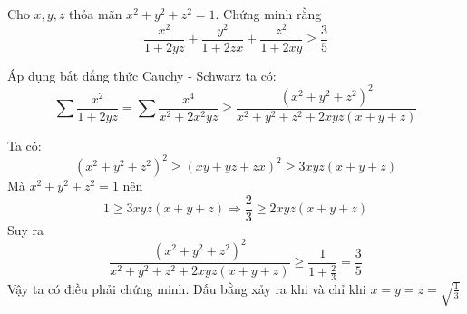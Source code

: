 \begin{problem}
	Cho $x, y, z$ thỏa mãn $x^2 + y^2 + z^2 = 1$. Chứng minh rằng
	$$
		\frac{x^2}{1 + 2yz} + \frac{y^2}{1 + 2zx} + \frac{z^2}{1 + 2xy} \ge \frac{3}{5}
	$$
	\solution

	Áp dụng bất đẳng thức Cauchy - Schwarz ta có:
	$$
		\sum \frac{x^2}{1 + 2yz} = \sum \frac{x^4}{x^2 + 2x^2yz} \ge 
		\frac{(x^2 + y^2 + z^2)^2}{x^2 + y^2 + z^2 + 2xyz(x + y + z)}
	$$

	Ta có:
	$$
		(x^2 + y^2 + z^2)^2 \ge (xy + yz + zx)^2 \ge 3xyz(x + y + z)
	$$
	Mà $x^2 + y^2 + z^2 = 1$ nên
	$$
		1 \ge 3xyz(x + y + z) \Rightarrow \frac{2}{3} \ge 2xyz(x + y + z)
	$$
	Suy ra
	$$
		\frac{(x^2 + y^2 + z^2)^2}{x^2 + y^2 + z^2 + 2xyz(x + y + z)} \ge \frac{1}{1 + \displaystyle \frac{2}{3}} = \frac{3}{5}
	$$
	Vậy ta có điều phải chứng minh. Dấu bằng xảy ra khi và chỉ khi $x = y = z = \displaystyle \sqrt{\frac{1}{3}}$
\end{problem}